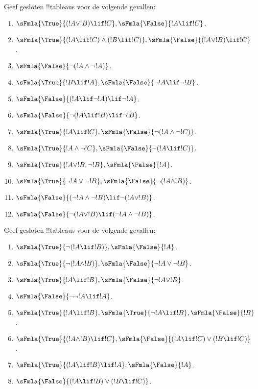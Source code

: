 \documentclass[openany]{memoir}
\begin{document}
\begin{prob}
Geef gesloten !!{tableau}s voor de volgende gevallen:
\begin{enumerate}
\item $\sFmla{\True}{(!A \lor !B) \lif !C}, \sFmla{\False}{!A \lif !C}$.
\item $\sFmla{\True}{(!A \lif !C) \land (!B \lif !C)}, \sFmla{\False}{(!A \lor !B) \lif !C}$.
\item $\sFmla{\False}{\lnot(!A \land \lnot !A)}$.
\item $\sFmla{\True}{!B \lif !A}, \sFmla{\False}{\lnot !A \lif \lnot !B}$.
\item $\sFmla{\False}{(!A \lif \lnot !A) \lif \lnot !A}$.
\item $\sFmla{\False}{\lnot(!A \lif !B) \lif \lnot !B}$.
\item $\sFmla{\True}{!A \lif !C}, \sFmla{\False}{\lnot (!A \land \lnot !C)}$.
\item $\sFmla{\True}{!A \land \lnot !C}, \sFmla{\False}{\lnot (!A \lif !C)}$.
\item $\sFmla{\True}{!A \lor !B, \lnot !B}, \sFmla{\False}{!A}$.
\item $\sFmla{\True}{\lnot !A \lor \lnot !B}, \sFmla{\False}{\lnot(!A \land !B)}$.
\item $\sFmla{\False}{(\lnot !A \land \lnot !B) \lif\lnot(!A \lor !B)}$.
\item $\sFmla{\False}{\lnot(!A \lor !B) \lif (\lnot !A \land \lnot !B)}$.
\end{enumerate}
\end{prob}

\begin{prob}
Geef gesloten !!{tableau}s voor de volgende gevallen:
\begin{enumerate}
\item $\sFmla{\True}{\lnot(!A \lif !B)}, \sFmla{\False}{!A}$.
\item $\sFmla{\True}{\lnot(!A \land !B)}, \sFmla{\False}{\lnot !A \lor \lnot !B}$.
\item $\sFmla{\True}{!A \lif !B}, \sFmla{\False}{\lnot !A \lor !B}$.
\item $\sFmla{\False}{\lnot \lnot !A \lif !A}$.
\item $\sFmla{\True}{!A \lif !B}, \sFmla{\True}{\lnot !A \lif !B}, \sFmla{\False}{!B}$.
\item $\sFmla{\True}{(!A \land !B) \lif !C}, \sFmla{\False}{(!A \lif !C) \lor (!B \lif !C)}$.
\item $\sFmla{\True}{(!A \lif !B) \lif !A}, \sFmla{\False}{!A}$.
\item $\sFmla{\False}{(!A \lif !B) \lor (!B \lif !C)}$.
\end{enumerate}
\end{prob}
\endgroup
\end{document}
